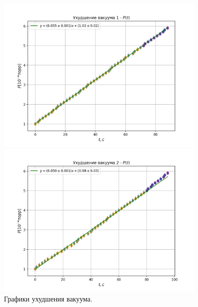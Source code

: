 \documentclass[a4paper, 12pt]{article}
\begin{document}
    \begin{figure}[h]
        \centerline{\includegraphics[width=0.9\textwidth]{pictures/cccnum_1.png}}
        \centerline{\includegraphics[width=0.9\textwidth]{pictures/cccnum_2.png}}
        \caption{Графики ухудшения вакуума.}
        \label{ris:cccnum}
    \end{figure}
\end{document}
